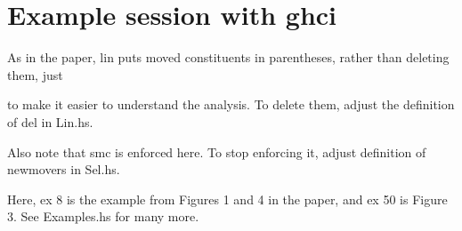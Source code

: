 \documentclass{article}
\begin{document}
\eject
\section*{Example session with ghci}
As in the paper, lin puts moved constituents in parentheses, rather than deleting them, just

to make it easier to understand the analysis. To delete them, adjust the definition of del in Lin.hs.

\noindent
Also note that smc is enforced here. To stop enforcing it, adjust definition of newmovers in Sel.hs.

\noindent
Here, ex 8 is the example from Figures 1 and 4 in the paper, and ex 50 is Figure 3. See Examples.hs for many more.

\inputminted[fontsize=\footnotesize]{haskell}{Examples-session.txt}
\end{document}
